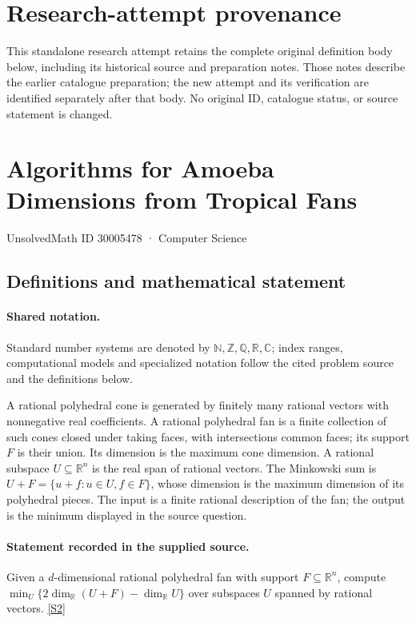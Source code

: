 \documentclass[11pt]{article}
\begin{document}
\section*{Research-attempt provenance}
This standalone research attempt retains the complete original definition body below,
including its historical source and preparation notes. Those notes describe the
earlier catalogue preparation; the new attempt and its verification are identified
separately after that body. No original ID, catalogue status, or source statement is changed.

\section{Algorithms for Amoeba Dimensions from Tropical Fans}\label{30005478}
{\small UnsolvedMath ID 30005478 · Computer Science}
\subsection{Definitions and mathematical statement}

\paragraph{Shared notation.}Standard number systems are denoted by $\mathbb N,\mathbb Z,\mathbb Q,\mathbb R,\mathbb C$; index ranges, computational models and specialized notation follow the cited problem source and the definitions below.


A rational polyhedral cone is generated by finitely many rational vectors with nonnegative real coefficients. A rational polyhedral fan is a finite collection of such cones closed under taking faces, with intersections common faces; its support $F$ is their union. Its dimension is the maximum cone dimension. A rational subspace $U\subseteq\mathbb R^n$ is the real span of rational vectors. The Minkowski sum is $U+F=\{u+f:u\in U,f\in F\}$, whose dimension is the maximum dimension of its polyhedral pieces. The input is a finite rational description of the fan; the output is the minimum displayed in the source question.
\paragraph{Statement recorded in the supplied source.}
Given a $d$-dimensional rational polyhedral fan with support $F\subseteq\mathbb R^n$, compute $\min_U\{2\dim_{\mathbb R}(U+F)-\dim_{\mathbb R}U\}$ over subspaces $U$ spanned by rational vectors. \href{https://doi.org/10.4171/owr/2023/15}{[S2]}
\end{document}
